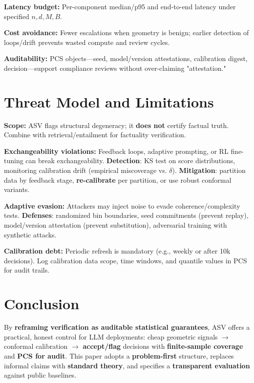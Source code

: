 \documentclass[11pt]{article}
\begin{document}
\textbf{Latency budget:} Per-component median/p95 and end-to-end latency under specified $n, d, M, B$.

\textbf{Cost avoidance:} Fewer escalations when geometry is benign; earlier detection of loops/drift prevents wasted compute and review cycles.

\textbf{Auditability:} PCS objects---seed, model/version attestations, calibration digest, decision---support compliance reviews without over-claiming "attestation."

\section{Threat Model and Limitations}
\label{sec:limitations}

\textbf{Scope:} ASV flags structural degeneracy; it \textbf{does not} certify factual truth. Combine with retrieval/entailment for factuality verification.

\textbf{Exchangeability violations:} Feedback loops, adaptive prompting, or RL fine-tuning can break exchangeability. \textbf{Detection}: KS test on score distributions, monitoring calibration drift (empirical miscoverage vs. $\delta$). \textbf{Mitigation}: partition data by feedback stage, \textbf{re-calibrate} per partition, or use robust conformal variants.

\textbf{Adaptive evasion:} Attackers may inject noise to evade coherence/complexity tests. \textbf{Defenses}: randomized bin boundaries, seed commitments (prevent replay), model/version attestation (prevent substitution), adversarial training with synthetic attacks.

\textbf{Calibration debt:} Periodic refresh is mandatory (e.g., weekly or after 10k decisions). Log calibration data scope, time windows, and quantile values in PCS for audit trails.

\section{Conclusion}
\label{sec:conclusion}

By \textbf{reframing verification as auditable statistical guarantees}, ASV offers a practical, honest control for LLM deployments: cheap geometric signals $\rightarrow$ conformal calibration $\rightarrow$ \textbf{accept/flag} decisions with \textbf{finite-sample coverage} and \textbf{PCS for audit}. This paper adopts a \textbf{problem-first} structure, replaces informal claims with \textbf{standard theory}, and specifies a \textbf{transparent evaluation} against public baselines.
\end{document}
